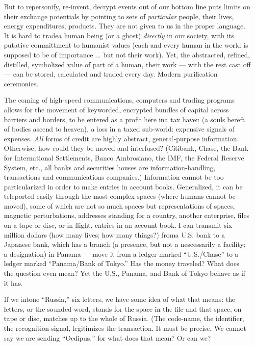\documentclass[11pt,twoside,draft]{memoir}
\begin{document}
But to repersonify, re-invent, decrypt
events out of our bottom line puts limits on
their exchange potentials by pointing to sets
of \emph{particular} people, their lives, energy expenditures, products. They are not given to
us in the proper language. It is hard to tradea
human being (or a ghost) \emph{directly} in our
society, with its putative committment to
humanist values (each and every human in
the world is supposed to be of importance
... but not their work). Yet, the abstracted,
refined, distilled, symbolized value of part
of a human, their work --- with the rest cast
off --- can be stored, calculated and traded
every day. Modern purification ceremonies.

The coming of high-speed communications, computers and trading programs allows for the movement of keyworded, encrypted bundles of capital across barriers
and borders, to be entered as a profit here ina
tax haven (a souls bereft of bodies ascend to
heaven), a loss in a taxed sub-world: expensive signals of expenses. \emph{All} forms of credit
are highly abstract, general-purpose information. Otherwise, how could they be moved
and interfused? (Citibank, Chase, the Bank
for International Settlements, Banco Ambrosiano, the IMF, the Federal Reserve System,
etc., all banks and securities houses are
information-handling, transactions and communications companies.) Information cannot be too particularized in order to make
entries in account books. Generalized, it can
be teleported easily through the most complex
spaces (where humans cannot be moved),
some of which are not so much spaces but
representations of spaces, magnetic perturbations, addresses standing for a country,
another enterprise, files on a tape or disc, or
in flight, entries in an account book. I can
transmit six million dollars (how many
lives; how many things?) froma U.S. bank to
a Japanese bank, which has a branch (a
presence, but not a nescessarily a facility; a
designation) in Panama --- move it from a
ledger marked \enquote{U.S.\slash Chase} to a ledger
marked \enquote{Panama\slash Bank of Tokyo.} Has the
money traveled? What does the question
even mean? Yet the U.S., Panama, and Bank
of Tokyo behave as if it has.

If we intone \enquote{Russia,} six letters, we have
some idea of what that means: the letters, or
the sounded word, stands for the space in the
file and that space, on tape or disc, matches
up to the whole of Russia. (The code-name,
the identifier, the recognition-signal, legitimizes the transaction. It must be precise. We
cannot say we are sending \enquote{Oedipus,} for
what does that mean? Or can we?
\end{document}
